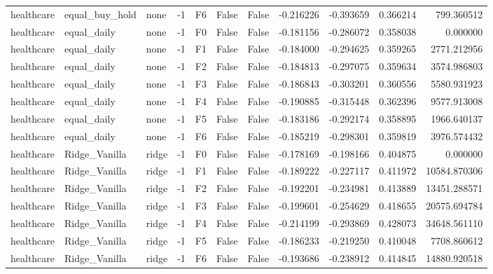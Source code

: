 \begin{tabular}{lllrlllrrrr}
healthcare & equal\_buy\_hold &      none &    -1 &  F6 &           False &            False & -0.216226 & -0.393659 & 0.366214 &       799.360512 \\
healthcare &    equal\_daily &      none &    -1 &  F0 &           False &            False & -0.181156 & -0.286072 & 0.358038 &         0.000000 \\
healthcare &    equal\_daily &      none &    -1 &  F1 &           False &            False & -0.184000 & -0.294625 & 0.359265 &      2771.212956 \\
healthcare &    equal\_daily &      none &    -1 &  F2 &           False &            False & -0.184813 & -0.297075 & 0.359634 &      3574.986803 \\
healthcare &    equal\_daily &      none &    -1 &  F3 &           False &            False & -0.186843 & -0.303201 & 0.360556 &      5580.931923 \\
healthcare &    equal\_daily &      none &    -1 &  F4 &           False &            False & -0.190885 & -0.315448 & 0.362396 &      9577.913008 \\
healthcare &    equal\_daily &      none &    -1 &  F5 &           False &            False & -0.183186 & -0.292174 & 0.358895 &      1966.640137 \\
healthcare &    equal\_daily &      none &    -1 &  F6 &           False &            False & -0.185219 & -0.298301 & 0.359819 &      3976.574432 \\
healthcare &  Ridge\_Vanilla &     ridge &    -1 &  F0 &           False &            False & -0.178169 & -0.198166 & 0.404875 &         0.000000 \\
healthcare &  Ridge\_Vanilla &     ridge &    -1 &  F1 &           False &            False & -0.189222 & -0.227117 & 0.411972 &     10584.870306 \\
healthcare &  Ridge\_Vanilla &     ridge &    -1 &  F2 &           False &            False & -0.192201 & -0.234981 & 0.413889 &     13451.288571 \\
healthcare &  Ridge\_Vanilla &     ridge &    -1 &  F3 &           False &            False & -0.199601 & -0.254629 & 0.418655 &     20575.694784 \\
healthcare &  Ridge\_Vanilla &     ridge &    -1 &  F4 &           False &            False & -0.214199 & -0.293869 & 0.428073 &     34648.561110 \\
healthcare &  Ridge\_Vanilla &     ridge &    -1 &  F5 &           False &            False & -0.186233 & -0.219250 & 0.410048 &      7708.860612 \\
healthcare &  Ridge\_Vanilla &     ridge &    -1 &  F6 &           False &            False & -0.193686 & -0.238912 & 0.414845 &     14880.920518 \\
\bottomrule
\end{tabular}

